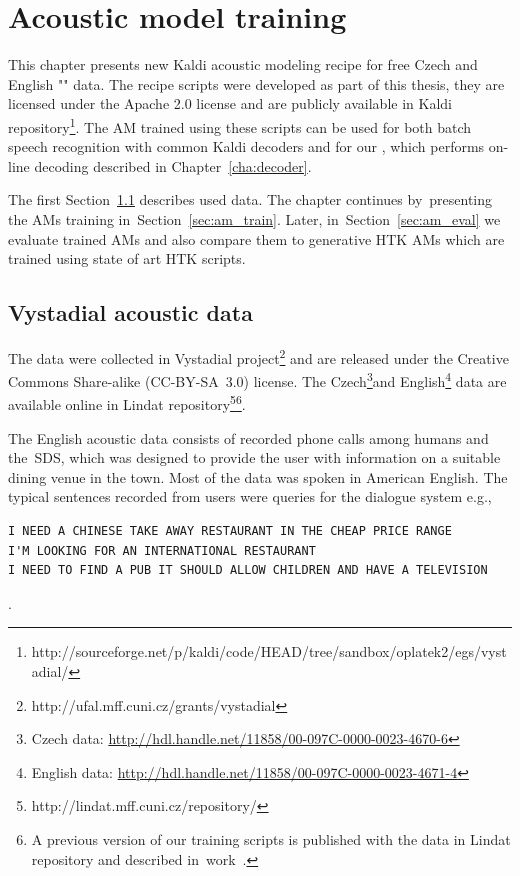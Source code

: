 \chapter{Acoustic model training}
\label{cha:train}

This chapter presents new Kaldi acoustic modeling recipe for free Czech and English "" data.
The recipe scripts were developed as part of this thesis, they are licensed under the Apache 2.0 license and are publicly available in Kaldi repository\footnote{http://sourceforge.net/p/kaldi/code/HEAD/tree/sandbox/oplatek2/egs/vystadial/}.
The \ac{AM} trained using these scripts can be used for both batch speech recognition with common Kaldi decoders and for our , which performs on-line decoding described in Chapter~\ref{cha:decoder}.

The first Section~\ref{sec:data} describes used data. 
The chapter continues by~presenting the \acp{AM} training in~Section~\ref{sec:am_train}. 
Later, in~Section~\ref{sec:am_eval} we evaluate trained \acp{AM} and also compare them to generative \ac{HTK} \acp{AM} which are trained using state of art \ac{HTK} scripts.

\section{Vystadial acoustic data}
\label{sec:data}

The data were collected in Vystadial project\footnote{http://ufal.mff.cuni.cz/grants/vystadial} and are released under the Creative Commons Share-alike (CC-BY-SA~3.0) license. 
The Czech\footnote{Czech data: \url{http://hdl.handle.net/11858/00-097C-0000-0023-4670-6}}and English\footnote{English data: \url{http://hdl.handle.net/11858/00-097C-0000-0023-4671-4}} data are available online in Lindat repository\footnote{{http://lindat.mff.cuni.cz/repository/}}\footnote{A previous version of our training scripts is published with the data in Lindat repository and described in~work~\cite{korvas_2014}.}.

The English acoustic data consists of recorded phone calls among humans and the~\acl{SDS}, which was designed to provide the user with information on a suitable dining venue in the town.
Most of the data was spoken in American English.
The typical sentences recorded from users were queries for the dialogue system e.g.,
\begin{verbatim}
I NEED A CHINESE TAKE AWAY RESTAURANT IN THE CHEAP PRICE RANGE
I'M LOOKING FOR AN INTERNATIONAL RESTAURANT
I NEED TO FIND A PUB IT SHOULD ALLOW CHILDREN AND HAVE A TELEVISION
\end{verbatim}.

